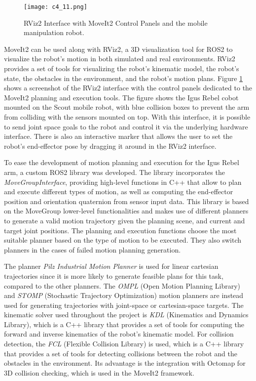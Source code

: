 \begin{figure}[t]
    \centering
    \texttt{[image: c4\_11.png]}
    \caption{RViz2 Interface with MoveIt2 Control Panels and the mobile manipulation robot.}
    \label{fig:rviz2}
\end{figure}


MoveIt2 can be used along with RViz2, a 3D visualization tool for ROS2 to visualize the
robot's motion in both simulated and real environments. RViz2 provides a set of tools for visualizing the robot's
kinematic model, the robot's state, the obstacles in the environment, and the robot's motion plans.
Figure \ref{fig:rviz2} shows a screenshot of the RViz2 interface with the control panels dedicated to the MoveIt2
planning and execution tools. The figure shows the Igus Rebel cobot mounted on the Scout mobile robot,
with blue collision boxes to prevent the arm from colliding with the sensors mounted on top.
With this interface, it is possible to send joint space goals to the robot
and control it via the underlying hardware interface. There is also an interactive marker that allows the user
to set the robot's end-effector pose by dragging it around in the RViz2 interface.

To ease the development of motion planning and execution for the Igus Rebel arm, a custom ROS2 library was developed.
The library incorporates the \textit{MoveGroupInterface}, providing high-level functions
in C++ that allow to plan and execute different types of motion, as well as computing the end-effector position
and orientation quaternion from sensor input data. This library is based on the MoveGroup lower-level functionalities 
and makes use of different planners to generate a valid motion trajectory given the planning scene, and current and target
joint positions. The planning and execution functions choose the most suitable planner based on the type of motion
to be executed. They also switch planners in the cases of failed motion planning generation.

The planner \textit{Pilz Industrial Motion Planner} is used for linear cartesian trajectories 
since it is more likely to generate feasible plans for this task, compared to the other planners.
The \textit{OMPL} (Open Motion Planning Library) and
\textit{STOMP} (Stochastic Trajectory Optimization) motion planners
are instead used for generating trajectories with joint-space or cartesian-space targets.
The kinematic solver used throughout the project is \textit{KDL} (Kinematics and Dynamics Library), which is a C++ library
that provides a set of tools for computing the forward and inverse kinematics of the robot's kinematic model.
For collision detection, the \textit{FCL} (Flexible Collision Library) is used, which is a C++ library that provides
a set of tools for detecting collisions between the robot and the obstacles in the environment.
Its advantage is the integration with Octomap for 3D collision checking, which is used in the MoveIt2 framework.

